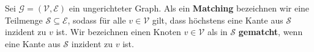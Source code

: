 \begin{definition}[Matching]\label{def:matching}
Sei $\mathcal{G} = (\mathcal{V}, \mathcal{E})$ ein ungerichteter Graph.
Als ein \textbf{Matching} bezeichnen wir eine Teilmenge $\mathcal{S} \subseteq \mathcal{E}$,
sodass für alle $v \in \mathcal{V}$ gilt, dass höchstens eine Kante 
aus $\mathcal{S}$ inzident zu $v$ ist.\break
Wir bezeichnen einen Knoten $v \in \mathcal{V}$ als in $\mathcal{S}$ \textbf{gematcht},
wenn eine Kante aus $\mathcal{S}$ inzident zu $v$ ist.\\\textnormal{\cite[S.~732]{cormen:matchings}}
\end{definition}
